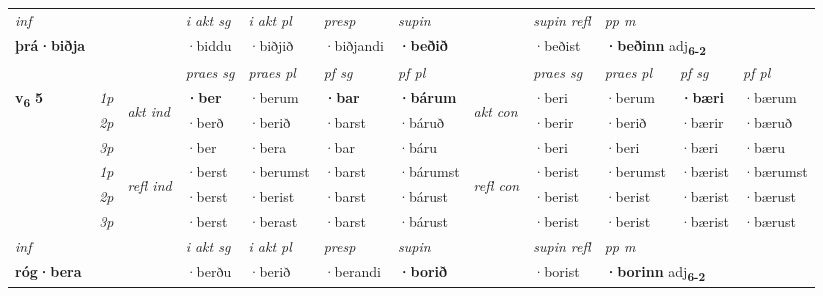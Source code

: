 \begin{longtable}[l]{X>{\footnotesize\itshape}llXXXXlXXXX}
   {\textit{inf}} & &  & \textit{i akt sg} & \textit{i akt pl}   & \textit{presp} & \textit{supin} && \textit{supin refl} & \textit{pp m} \\*
  {\textbf{þrá\allowbreak ·biðja}} & && ·biddu  & ·biðjið   & ·biðjandi &  \textbf{·beðið} && ·beðist & \multicolumn{2}{l}{\textbf{·beðinn} adj\textbf{\textsubscript{6-2}}} \\*

\midrule

 & &   & \textit{praes sg}  & \textit{praes pl}    & \textit{ pf sg} & \textit{pf pl} & & \textit{praes sg}  & \textit{praes pl}    & \textit{pf sg} & \textit{pf pl }  \\ \cmidrule{4-7} \cmidrule{9-12}
 \multirow{2}{*}{{{\textbf{v{\textsubscript{6}}} \Large{\textbf{5}}}}}  & 1p & \multirow{3}{*}{\begin{turn}{90}\textit{akt ind}\end{turn}} & \textbf{·ber} & ·berum & \textbf{·bar} & \textbf{·bárum} & \multirow{3}{*}{\begin{turn}{90}\textit{akt con}\end{turn}} &·beri & ·berum & \textbf{·bæri} & ·bærum\\*
 & 2p &  &  ·berð  & ·berið & ·barst & ·báruð & & ·berir & ·berið & ·bærir & ·bæruð \\*
 & 3p &  & ·ber & ·bera & ·bar & ·báru & & ·beri & ·beri& ·bæri & ·bæru \\*
\cmidrule{4-7} \cmidrule{9-12}
 & 1p & \multirow{3}{*}{\begin{turn}{90}\textit{refl ind}\end{turn}}  & ·berst & ·berumst & ·barst & ·bárumst & \multirow{3}{*}{\begin{turn}{90}\textit{refl con}\end{turn}}  &·berist & ·berumst & ·bærist & ·bærumst \\*
 & 2p &  & ·berst & ·berist & ·barst & ·bárust & &·berist & ·berist & ·bærist & ·bærust \\*
 & 3p  & & ·berst & ·berast & ·barst & ·bárust & & ·berist & ·berist& ·bærist & ·bærust \\*
\cmidrule{4-7} \cmidrule{9-12}

   {\textit{inf}} & &  & \textit{i akt sg} & \textit{i akt pl}   & \textit{presp} & \textit{supin} && \textit{supin refl} & \textit{pp m} \\*
  {\textbf{róg\allowbreak ·bera}} & && ·berðu  & ·berið   & ·berandi &  \textbf{·borið} && ·borist & \multicolumn{2}{l}{\textbf{·borinn} adj\textbf{\textsubscript{6-2}}} \\*


\end{longtable}
